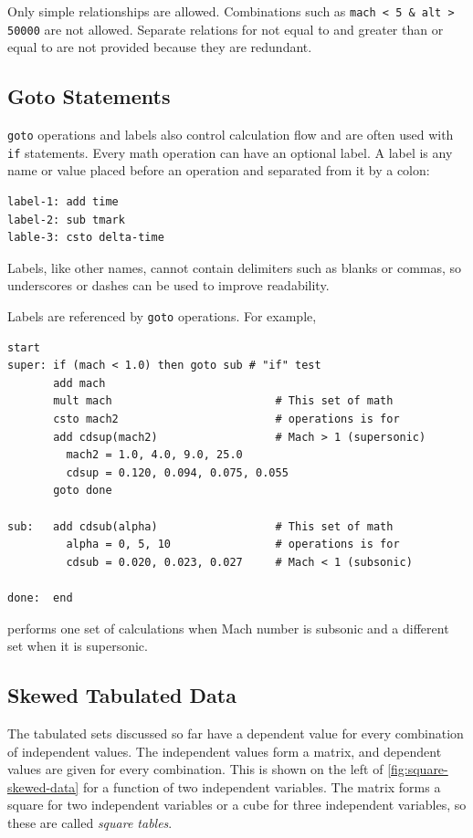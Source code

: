 Only simple relationships are allowed. Combinations such as
\texttt{mach < 5 \& alt > 50000} are not allowed. Separate relations for not equal
to and greater than or equal to are not provided because they are redundant.

\subsection{Goto Statements}\label{sec:goto-statements}

\texttt{goto} operations and labels also control calculation flow and are often used
with \texttt{if} statements. Every math operation can have an optional label. A label
is any name or value placed before an operation and separated from it by a colon:

\begin{lstlisting}[style=taosmanual]
label-1: add time
label-2: sub tmark
lable-3: csto delta-time
\end{lstlisting}

Labels, like other names, cannot contain delimiters such as blanks or commas, so
underscores or dashes can be used to improve readability.

Labels are referenced by \texttt{goto} operations. For example,

\begin{lstlisting}[style=taosmanual]
start
super: if (mach < 1.0) then goto sub # "if" test
       add mach
       mult mach                         # This set of math
       csto mach2                        # operations is for
       add cdsup(mach2)                  # Mach > 1 (supersonic)
         mach2 = 1.0, 4.0, 9.0, 25.0
         cdsup = 0.120, 0.094, 0.075, 0.055
       goto done

sub:   add cdsub(alpha)                  # This set of math
         alpha = 0, 5, 10                # operations is for
         cdsub = 0.020, 0.023, 0.027     # Mach < 1 (subsonic)

done:  end
\end{lstlisting}

performs one set of calculations when Mach number is subsonic and a different set
when it is supersonic.

\subsection{Skewed Tabulated Data}\label{sec:skewed-tabulated-data}

The tabulated sets discussed so far have a dependent value for every combination of
independent values. The independent values form a matrix, and dependent values are
given for every combination. This is shown on the left of
\cref{fig:square-skewed-data} for a function of two independent variables. The
matrix forms a square for two independent variables or a cube for three independent
variables, so these are called \emph{square tables}.

